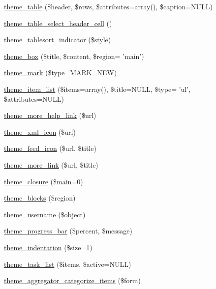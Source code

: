 \begin{CompactItemize}
\item 
\hyperlink{group__themeable_g77f053aaa73bbeaa3943bf8f06ce625d}{theme\_\-table} (\$header, \$rows, \$attributes=array(), \$caption=NULL)
\item 
\hyperlink{group__themeable_ge2a1acba9910db3b633eb9339b39d65d}{theme\_\-table\_\-select\_\-header\_\-cell} ()
\item 
\hyperlink{group__themeable_ga114475e1c769831776ae8af627595bc}{theme\_\-tablesort\_\-indicator} (\$style)
\item 
\hyperlink{group__themeable_ga2b9684385ee0e8c0e8a8947925047ba}{theme\_\-box} (\$title, \$content, \$region= 'main')
\item 
\hyperlink{group__themeable_gf27d1fe596ce8f28199ca2bed5b9816d}{theme\_\-mark} (\$type=MARK\_\-NEW)
\item 
\hyperlink{group__themeable_g0f8d002d54905d758e38a3d516cbfe69}{theme\_\-item\_\-list} (\$items=array(), \$title=NULL, \$type= 'ul', \$attributes=NULL)
\item 
\hyperlink{group__themeable_ga0b3233e46dcfc24ecab60b769c6caab}{theme\_\-more\_\-help\_\-link} (\$url)
\item 
\hyperlink{group__themeable_ga9cac9d4b695e8c4edd9e324adc0c9fb}{theme\_\-xml\_\-icon} (\$url)
\item 
\hyperlink{group__themeable_ge5d10f67376dfa4cd18256bf1d496169}{theme\_\-feed\_\-icon} (\$url, \$title)
\item 
\hyperlink{group__themeable_ge54d44857d9145119af69cd97018278f}{theme\_\-more\_\-link} (\$url, \$title)
\item 
\hyperlink{group__themeable_gfc75590efceee02ad1c120d060d628ae}{theme\_\-closure} (\$main=0)
\item 
\hyperlink{group__themeable_g248f091cf3b4cb0d194933c052e44740}{theme\_\-blocks} (\$region)
\item 
\hyperlink{group__themeable_gf08895a75b95547417a302272e0b027c}{theme\_\-username} (\$object)
\item 
\hyperlink{group__themeable_g929fbdc2cc220d02dd1da889232991ff}{theme\_\-progress\_\-bar} (\$percent, \$message)
\item 
\hyperlink{group__themeable_g3fb21186ce53fffb040c3e1db1504671}{theme\_\-indentation} (\$size=1)
\item 
\hyperlink{group__themeable_g83bdead8c42251faaf93ddc2480b9d7f}{theme\_\-task\_\-list} (\$items, \$active=NULL)
\item 
\hyperlink{group__themeable_gd4db01ba5914e1aba833f470ac41e184}{theme\_\-aggregator\_\-categorize\_\-items} (\$form)

\end{CompactItemize}
